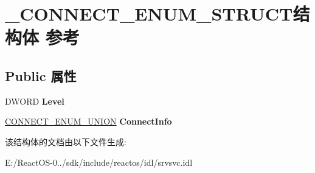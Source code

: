 \hypertarget{struct___c_o_n_n_e_c_t___e_n_u_m___s_t_r_u_c_t}{}\section{\+\_\+\+C\+O\+N\+N\+E\+C\+T\+\_\+\+E\+N\+U\+M\+\_\+\+S\+T\+R\+U\+C\+T结构体 参考}
\label{struct___c_o_n_n_e_c_t___e_n_u_m___s_t_r_u_c_t}
\subsection*{Public 属性}
\begin{DoxyCompactItemize}
\item 
\mbox{\label{struct___c_o_n_n_e_c_t___e_n_u_m___s_t_r_u_c_t_aa66479bd006b98e22e63b14cb65beb4b}} 
D\+W\+O\+RD {\bfseries Level}
\item 
\mbox{\label{struct___c_o_n_n_e_c_t___e_n_u_m___s_t_r_u_c_t_aa461890512dbc070f8e14fdbd7577489}} 
\hyperlink{union___c_o_n_n_e_c_t___e_n_u_m___u_n_i_o_n}{C\+O\+N\+N\+E\+C\+T\+\_\+\+E\+N\+U\+M\+\_\+\+U\+N\+I\+ON} {\bfseries Connect\+Info}
\end{DoxyCompactItemize}


该结构体的文档由以下文件生成\+:\begin{DoxyCompactItemize}
\item 
E\+:/\+React\+O\+S-\/0../sdk/include/reactos/idl/srvsvc.\+idl\end{DoxyCompactItemize}
